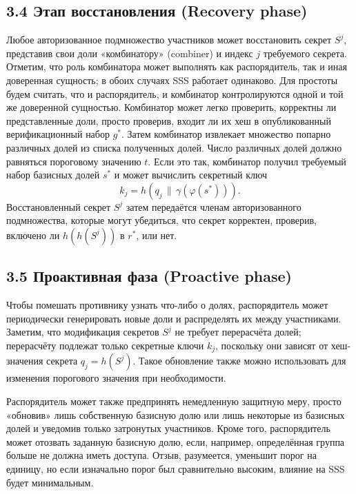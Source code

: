 \subsection*{3.4 \quad Этап восстановления (Recovery phase)}

Любое авторизованное подмножество участников может восстановить секрет \(S^{j}\), представив свои доли «комбинатору» (combiner) и индекс \(j\) требуемого секрета. Отметим, что роль комбинатора может выполнять как распорядитель, так и иная доверенная сущность; в обоих случаях SSS работает одинаково. Для простоты будем считать, что и распорядитель, и комбинатор контролируются одной и той же доверенной сущностью. Комбинатор может легко проверить, корректны ли представленные доли, просто проверив, входит ли их хеш в опубликованный верификационный набор \(g^{\ast}\). Затем комбинатор извлекает множество попарно различных долей из списка полученных долей. Число различных долей должно равняться пороговому значению \(t\). Если это так, комбинатор получил требуемый набор базисных долей \(s^{\ast}\) и может вычислить секретный ключ
\[
k_j = h\!\left(q_j \,\|\, \gamma(\varphi(s^{\ast}))\right).
\]
Восстановленный секрет \(S^{j}\) затем передаётся членам авторизованного подмножества, которые могут убедиться, что секрет корректен, проверив, включено ли \(h(h(S^{j}))\) в \(r^{\ast}\), или нет.

\subsection*{3.5 \quad Проактивная фаза (Proactive phase)}

Чтобы помешать противнику узнать что-либо о долях, распорядитель может периодически генерировать новые доли и распределять их между участниками. Заметим, что модификация секретов \(S^{j}\) не требует перерасчёта долей; перерасчёту подлежат только секретные ключи \(k_j\), поскольку они зависят от хеш-значения секрета \(q_j=h(S^{j})\). Такое обновление также можно использовать для изменения порогового значения при необходимости.

Распорядитель может также предпринять немедленную защитную меру, просто «обновив» лишь собственную базисную долю или лишь некоторые из базисных долей и уведомив только затронутых участников. Кроме того, распорядитель может отозвать заданную базисную долю, если, например, определённая группа больше не должна иметь доступа. Отзыв, разумеется, уменьшит порог на единицу, но если изначально порог был сравнительно высоким, влияние на SSS будет минимальным.

